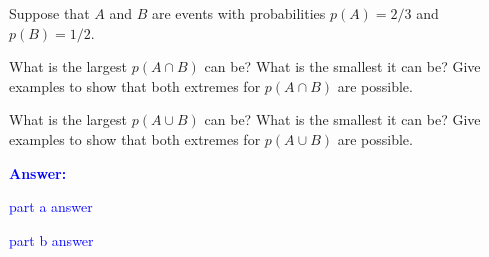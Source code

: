 \item{}
Suppose that $A$ and $B$ are events with probabilities $p(A)=2/3$ and $p(B)=
1/2$.
\begin{list}{\textbf{.}}{}
\item What is the largest $p(A\cap B)$ can be? What is the smallest it can be?
Give examples to show that both extremes for $p(A\cap B)$ are possible.
\item What is the largest $p(A\cup B)$ can be? What is the smallest it can be?
Give examples to show that both extremes for $p(A\cup B)$ are possible.
\end{list}
\vskip12pt
\ifanswers
\textcolor{blue}{
\textbf{Answer:}\\[6pt]
\begin{list}{\textbf{.}}{}
\item part a answer
\item part b answer
\end{list}
}
\newpage
\fi
